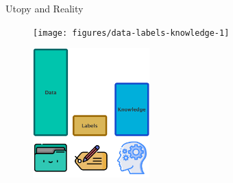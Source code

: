 \documentclass[presentation]{beamer}\mode<presentation>{\usetheme{blackAMSBolognaFC}}
\begin{document}
\begin{frame}[c,allowframebreaks]{Utopy and Reality}
    \hspace{0.5cm}
    \begin{figure}
        \texttt{[image: figures/data-labels-knowledge-1]}
    \end{figure}
    \hfill

    \framebreak

    \hfill
    \begin{figure}
        \includegraphics[width=0.4\textwidth,right]{figures/data-labels-knowledge-2}
    \end{figure}
    \hspace{0.5cm}

\end{frame}
\end{document}

